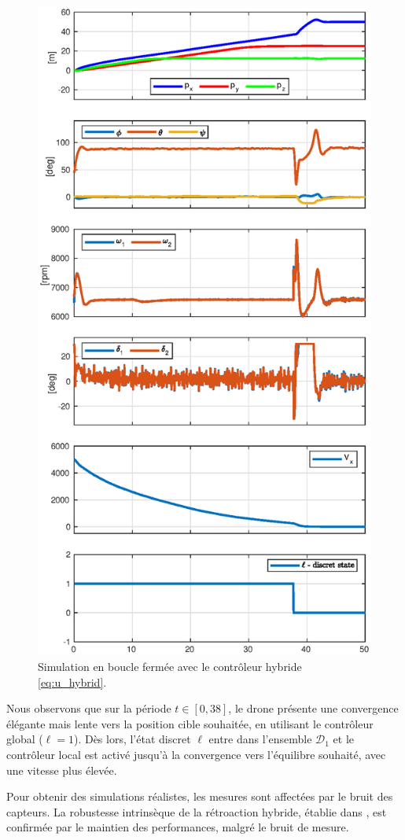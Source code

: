 \begin{figure}[ht!]
    \centering
    \includegraphics[trim=0cm 0cm 0cm 1.1cm,clip,width=0.7\columnwidth]{figures/switch_paper2.eps}
    \caption{Simulation en boucle fermée avec le contrôleur hybride \eqref{eq:u_hybrid}.}
    \label{fig_sim}
\end{figure}

Nous observons que sur la période $t \in \left[0,38\right]$, le drone
présente une convergence élégante mais lente vers la position cible souhaitée, en utilisant le contrôleur global ($\ell=1$). Dès lors, l'état discret $\ell$ entre dans l'ensemble $\mathcal{D}_1$ et le contrôleur local est activé jusqu'à la convergence vers l'équilibre souhaité, avec une vitesse plus élevée.

Pour obtenir des simulations réalistes, les mesures sont affectées par 
le bruit des capteurs. La robustesse intrinsèque de la rétroaction hybride, établie dans \cite[Chapitre 7]{65}, est confirmée par le maintien des performances, malgré le bruit de mesure.

